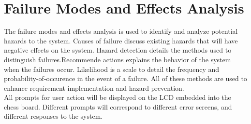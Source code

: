 \documentclass{article}
\begin{document}
\section{Failure Modes and Effects Analysis}
{The failure modes and effects analysis is used to identify and analyze potential 
hazards to the system. Causes of failure discuss existing hazards that will have
negative effects on the system. Hazard detection details the methods used to distinguish
failures.Recommende actions explains the behavior of the system when the failures
occur. Likelihood is a scale to detail the frequency and probability-of-occurence
in the event of a failure. All of these methods are used to enhance requirement 
implementation and hazard prevention. \\

All prompts for user action will be displayed on the LCD embedded into the chess board.
Different prompts will correspond to different error screens, and different responses to the system.} 
\end{document}
